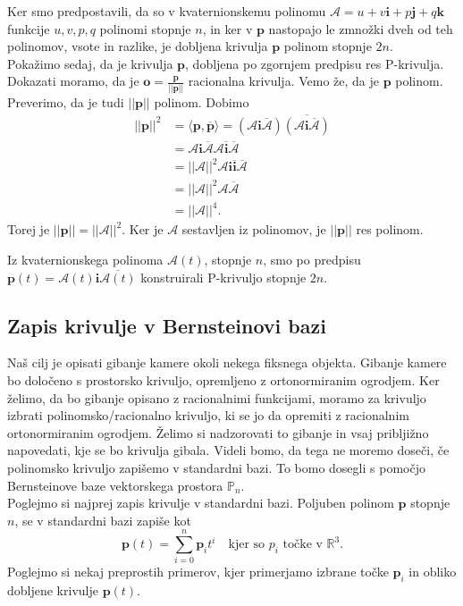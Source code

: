 \documentclass[mat1]{fmfdelo}
\newcommand{\R}{\mathbb R}
\newcommand{\ii}{\boldsymbol i}
\newcommand{\jj}{\boldsymbol j}
\newcommand{\kk}{\boldsymbol k}
\newcommand{\pp}{\boldsymbol p}
\newcommand{\A}{\mathcal A}
\begin{document}
Ker smo predpostavili, da so v kvaternionskemu polinomu $\A=u+v\ii+p\jj+q\kk$ funkcije $u,v,p,q$ polinomi stopnje $n$, in ker v $\pp$ nastopajo le zmnožki dveh od teh polinomov, vsote in razlike, je dobljena krivulja $\pp$ polinom stopnje $2n$.\\
Pokažimo sedaj, da je krivulja $\pp$, dobljena po zgornjem predpisu res P-krivulja. Dokazati moramo, da je $\boldsymbol{o} = \frac{\pp}{||\pp||}$ racionalna krivulja. Vemo že, da je $\pp$ polinom. Preverimo, da je tudi $||\pp||$ polinom. Dobimo
\begin{equation*}
\begin{split}
||\pp||^2 &= \langle \pp,\overline{\pp}\rangle = (\A\ii\overline{\A})\overline{(\A\ii\overline{\A})} \\
&= \A\ii\overline{\A}\A\overline{\ii} \overline{\A} \\
&= ||\A||^2 \A \ii \overline{\ii} \overline{\A} \\
& = ||\A||^2 \A \overline{\A} \\
&=||\A||^4.
\end{split}
\end{equation*}
Torej je $||\pp|| = ||\A||^2$. Ker je $\A$ sestavljen iz polinomov, je $||\pp||$ res polinom.\\

\begin{lema}
	Iz kvaternionskega polinoma $\A(t)$, stopnje $n$, smo po predpisu\\ $\pp(t) = \A(t)\ii\overline{\A(t)}$ konstruirali P-krivuljo stopnje $2n$. 
\end{lema}

\subsection{Zapis krivulje v Bernsteinovi bazi}
Naš cilj je opisati gibanje kamere okoli nekega fiksnega objekta. Gibanje kamere bo določeno s prostorsko krivuljo, opremljeno z ortonormiranim ogrodjem. Ker želimo, da bo gibanje opisano z racionalnimi funkcijami, moramo za krivuljo izbrati polinomsko/racionalno krivuljo, ki se jo da opremiti z racionalnim ortonormiranim ogrodjem. Želimo si nadzorovati to gibanje in vsaj pribljižno napovedati, kje se bo krivulja gibala. Videli bomo, da tega ne moremo doseči, če polinomsko krivuljo zapišemo v standardni bazi. To bomo dosegli s pomočjo Bernsteinove baze vektorskega prostora $\mathbb{P}_n$. \\
Poglejmo si najprej zapis krivulje v standardni bazi. Poljuben polinom $\pp$ stopnje $n$, se v standardni bazi zapiše kot
\begin{equation*}
\pp(t) = \sum_{i=0}^n \pp_i t^i \quad \text{kjer so $p_i$ točke v $\R^3$.}
\end{equation*}
Poglejmo si nekaj preprostih primerov, kjer primerjamo izbrane točke $\pp_i$ in obliko dobljene krivulje $\pp(t)$.
\end{document}
